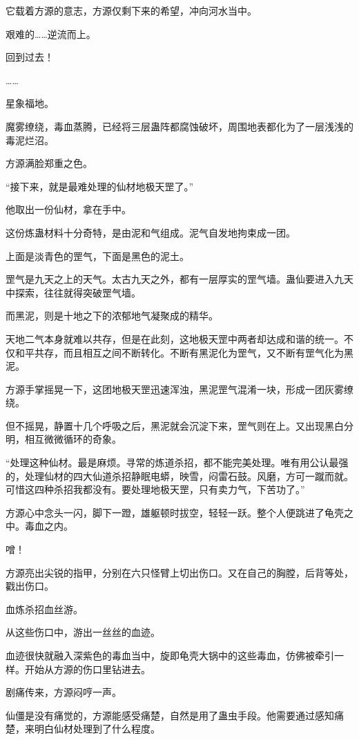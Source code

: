 \begin{this_body}
它载着方源的意志，方源仅剩下来的希望，冲向河水当中。

艰难的……逆流而上。

回到过去！

……

星象福地。

魔雾缭绕，毒血蒸腾，已经将三层蛊阵都腐蚀破坏，周围地表都化为了一层浅浅的毒泥烂沼。

方源满脸郑重之色。

“接下来，就是最难处理的仙材地极天罡了。”

他取出一份仙材，拿在手中。

这份炼蛊材料十分奇特，是由泥和气组成。泥气自发地拘束成一团。

上面是淡青色的罡气，下面是黑色的泥土。

罡气是九天之上的天气。太古九天之外，都有一层厚实的罡气墙。蛊仙要进入九天中探索，往往就得突破罡气墙。

而黑泥，则是十地之下的浓郁地气凝聚成的精华。

天地二气本身就难以共存，但是在此刻，这地极天罡中两者却达成和谐的统一。不仅和平共存，而且相互之间不断转化。不断有黑泥化为罡气，又不断有罡气化为黑泥。

方源手掌摇晃一下，这团地极天罡迅速浑浊，黑泥罡气混淆一块，形成一团灰雾缭绕。

但不摇晃，静置十几个呼吸之后，黑泥就会沉淀下来，罡气则在上。又出现黑白分明，相互微微循环的奇象。

“处理这种仙材。最是麻烦。寻常的炼道杀招，都不能完美处理。唯有用公认最强的，处理仙材的四大仙道杀招静眠电蟒，映雪，闷雷石鼓。风磨，方可一蹴而就。可惜这四种杀招我都没有。要处理地极天罡，只有卖力气，下苦功了。”

方源心中念头一闪，脚下一蹬，雄躯顿时拔空，轻轻一跃。整个人便跳进了龟壳之中。毒血之内。

噌！

方源亮出尖锐的指甲，分别在六只怪臂上切出伤口。又在自己的胸膛，后背等处，戳出伤口。

血炼杀招血丝游。

从这些伤口中，游出一丝丝的血迹。

血迹很快就融入深紫色的毒血当中，旋即龟壳大锅中的这些毒血，仿佛被牵引一样。开始从方源的伤口里钻进去。

剧痛传来，方源闷哼一声。

仙僵是没有痛觉的，方源能感受痛楚，自然是用了蛊虫手段。他需要通过感知痛楚，来明白仙材处理到了什么程度。


\end{this_body}
